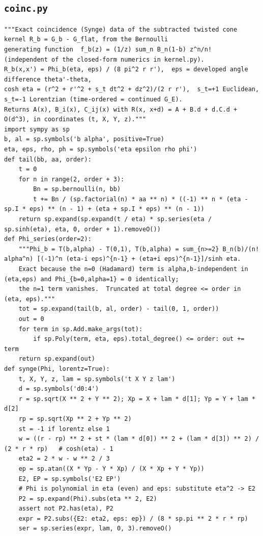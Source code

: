 \documentclass[10pt]{article}
\begin{document}
\subsection{\texttt{coinc.py}}
\begin{lstlisting}
"""Exact coincidence (Synge) data of the subtracted twisted cone kernel R_b = G_b - G_flat, from the Bernoulli
generating function  f_b(z) = (1/z) sum_n B_n(1-b) z^n/n!  (independent of the closed-form numerics in kernel.py).
R_b(x,x') = Phi_b(eta, eps) / (8 pi^2 r r'),  eps = developed angle difference theta'-theta,
cosh eta = (r^2 + r'^2 + s_t dt^2 + dz^2)/(2 r r'),  s_t=+1 Euclidean, s_t=-1 Lorentzian (time-ordered = continued G_E).
Returns A(x), B_i(x), C_ij(x) with R(x, x+d) = A + B.d + d.C.d + O(d^3), in coordinates (t, X, Y, z)."""
import sympy as sp
b, al = sp.symbols('b alpha', positive=True)
eta, eps, rho, ph = sp.symbols('eta epsilon rho phi')
def tail(bb, aa, order):
    t = 0
    for n in range(2, order + 3):
        Bn = sp.bernoulli(n, bb)
        t += Bn / (sp.factorial(n) * aa ** n) * ((-1) ** n * (eta - sp.I * eps) ** (n - 1) + (eta + sp.I * eps) ** (n - 1))
    return sp.expand(sp.expand(t / eta) * sp.series(eta / sp.sinh(eta), eta, 0, order + 1).removeO())
def Phi_series(order=2):
    """Phi_b = T(b,alpha) - T(0,1), T(b,alpha) = sum_{n>=2} B_n(b)/(n! alpha^n) [(-1)^n (eta-i eps)^{n-1} + (eta+i eps)^{n-1}]/sinh eta.
    Exact because the n=0 (Hadamard) term is alpha,b-independent in (eta,eps) and Phi_{b=0,alpha=1} = 0 identically;
    the n=1 term vanishes.  Truncated at total degree <= order in (eta, eps)."""
    tot = sp.expand(tail(b, al, order) - tail(0, 1, order))
    out = 0
    for term in sp.Add.make_args(tot):
        if sp.Poly(term, eta, eps).total_degree() <= order: out += term
    return sp.expand(out)
def synge(Phi, lorentz=True):
    t, X, Y, z, lam = sp.symbols('t X Y z lam')
    d = sp.symbols('d0:4')
    r = sp.sqrt(X ** 2 + Y ** 2); Xp = X + lam * d[1]; Yp = Y + lam * d[2]
    rp = sp.sqrt(Xp ** 2 + Yp ** 2)
    st = -1 if lorentz else 1
    w = ((r - rp) ** 2 + st * (lam * d[0]) ** 2 + (lam * d[3]) ** 2) / (2 * r * rp)   # cosh(eta) - 1
    eta2 = 2 * w - w ** 2 / 3
    ep = sp.atan((X * Yp - Y * Xp) / (X * Xp + Y * Yp))
    E2, EP = sp.symbols('E2 EP')
    # Phi is polynomial in eta (even) and eps: substitute eta^2 -> E2
    P2 = sp.expand(Phi).subs(eta ** 2, E2)
    assert not P2.has(eta), P2
    expr = P2.subs({E2: eta2, eps: ep}) / (8 * sp.pi ** 2 * r * rp)
    ser = sp.series(expr, lam, 0, 3).removeO()

\end{lstlisting}
\end{document}
